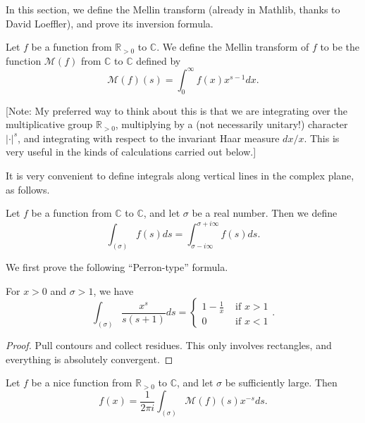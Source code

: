 
In this section, we define the Mellin transform (already in Mathlib, thanks to David Loeffler), and prove its inversion formula.

\begin{definition}
Let $f$ be a function from $\mathbb{R}_{>0}$ to $\mathbb{C}$. We define the Mellin transform of $f$ to be the function $\mathcal{M}(f)$ from $\mathbb{C}$ to $\mathbb{C}$ defined by
$$\mathcal{M}(f)(s) = \int_0^\infty f(x)x^{s-1}dx.$$
\end{definition}

[Note: My preferred way to think about this is that we are integrating over the multiplicative group $\mathbb{R}_{>0}$, multiplying by a (not necessarily unitary!) character $|\cdot|^s$, and integrating with respect to the invariant Haar measure $dx/x$. This is very useful in the kinds of calculations carried out below.]




It is very convenient to define integrals along vertical lines in the complex plane, as follows.
\begin{definition}\label{VerticalIntegral}
Let $f$ be a function from $\mathbb{C}$ to $\mathbb{C}$, and let $σ$ be a real number. Then we define
$$\int_{(σ)}f(s)ds = \int_{σ-i\infty}^{σ+i\infty}f(s)ds.$$
\end{definition}



We first prove the following ``Perron-type'' formula.
\begin{lemma}\label{PerronFormula}
For $x>0$ and $σ>1$, we have
$$
\int_{(σ)}\frac{x^s}{s(s+1)}ds = \begin{cases}
1-\frac1x & \text{ if }x>1\\
0 & \text{ if } x<1
\end{cases}.
$$
\end{lemma}



\begin{proof}
Pull contours and collect residues. This only involves rectangles, and everything is absolutely convergent.
\end{proof}



\begin{theorem}\label{MellinInversion}
Let $f$ be a nice function from $\mathbb{R}_{>0}$ to $\mathbb{C}$, and let $σ$ be sufficiently large. Then
$$f(x) = \frac{1}{2\pi i}\int_{(σ)}\mathcal{M}(f)(s)x^{-s}ds.$$
\end{theorem}



